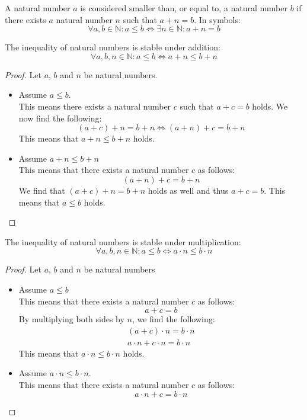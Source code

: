 \documentclass[main.tex]{subfiles}
\begin{document}
\begin{de}
  \label{de:inequality-natural-numbers}
  A natural number $a$ is considered smaller than, or equal to, a natural number $b$ if there exists $a$ natural number $n$ such that $a + n = b$. In symbols:
  \[ \forall a,b \in \mathbb{N}: a \le b \Leftrightarrow \exists n\in\mathbb{N}: a + n = b \]
\end{de}

\begin{pr}
  \label{pr:inequality-of-natural-numers-stable-under-addition}
  The inequality of natural numbers is stable under addition:
  \[ \forall a, b, n \in \mathbb{N}: a \le b \Leftrightarrow a + n \le b + n \]

  \begin{proof}
    Let $a$, $b$ and $n$ be natural numbers.
    \noindent
    \begin{itemize}
      \item \bra
        Assume $a \le b$.\\
        This means there exists a natural number $c$ such that $a+c = b$ holds.
        We now find the following:
        \[ (a + c) + n = b + n \Leftrightarrow (a + n) + c = b + n \]
        This means that $a + n \le b + n$ holds.
      \item \bla
        Assume $a + n \le b + n$\\
        This means that there exists a natural number $c$ as follows:
        \[ (a + n) + c = b + n \]
        We find that $(a + c) + n = b + n$ holds as well and thus $a + c = b$.
        This means that $a \le b$ holds.
    \end{itemize}
  \end{proof}
\end{pr}

\begin{pr}
  The inequality of natural numbers is stable under multiplication:
  \[ \forall a, b, n \in \mathbb{N}: a \le b \Leftrightarrow a \cdot n \le b \cdot n \]

  \begin{proof}
    Let $a$, $b$ and $n$ be natural numbers
    \noindent
    \begin{itemize}
      \item \bra
        Assume $a \le b$\\
        This means that there exists a natural number $c$ as follows:
        \[ a + c = b \]
        By multiplying both sides by $n$, we find the following:
        \begin{align*}
          (a + c) \cdot n = b \cdot n\\
          a\cdot n + c \cdot n = b \cdot n
        \end{align*}
        This means that $a\cdot n \le b \cdot n$ holds.
      \item \bla
        Assume $a \cdot n \le b \cdot n$.\\
        This means that there exists a natural number $c$ as follows:
        \[ a\cdot n + c = b \cdot n \]
    \end{itemize}
  \end{proof}
\end{pr}
\end{document}
